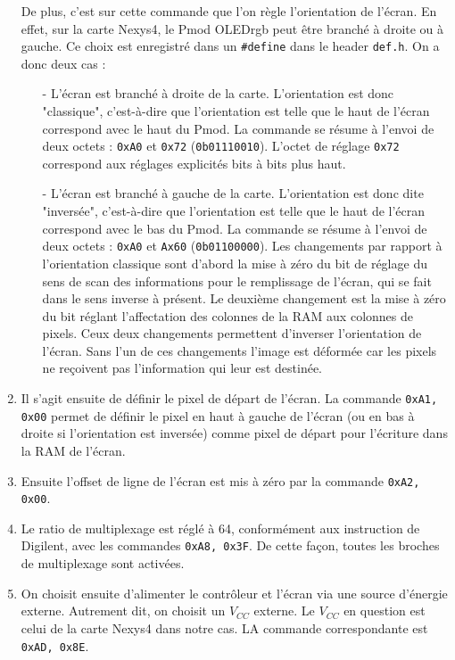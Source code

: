 \documentclass[11pt]{article}
\begin{document}
\begin{enumerate}
    De plus, c'est sur cette commande que l'on règle l'orientation de l'écran. En effet, sur la carte Nexys4, le Pmod OLEDrgb peut être branché à droite ou à gauche. Ce choix est enregistré dans un \texttt{\#define} dans le header \texttt{def.h}. On a donc deux cas : 
    \begin{itemize}
        \item[-] L'écran est branché à droite de la carte. L'orientation est donc "classique", c'est-à-dire que l'orientation est telle que le haut de l'écran correspond avec le haut du Pmod. La commande se résume à l'envoi de deux octets : \texttt{0xA0} et \texttt{0x72} (\texttt{0b01110010}). L'octet de réglage \texttt{0x72} correspond aux réglages explicités bits à bits plus haut. 
        \item[-] L'écran est branché à gauche de la carte. L'orientation est donc dite "inversée", c'est-à-dire que l'orientation est telle que le haut de l'écran correspond avec le bas du Pmod. La commande se résume à l'envoi de deux octets : \texttt{0xA0} et \texttt{Ax60} (\texttt{0b01100000}). Les changements par rapport à l'orientation classique sont d'abord la mise à zéro du bit de réglage du sens de scan des informations pour le remplissage de l'écran, qui se fait dans le sens inverse à présent. Le deuxième changement est la mise à zéro du bit réglant l'affectation des colonnes de la RAM aux colonnes de pixels. Ceux deux changements permettent d'inverser l'orientation de l'écran. Sans l'un de ces changements l'image est déformée car les pixels ne reçoivent pas l'information qui leur est destinée. 
    \end{itemize}

    \item Il s'agit ensuite de définir le pixel de départ de l'écran. La commande \texttt{0xA1, 0x00} permet de définir le pixel en haut à gauche de l'écran (ou en bas à droite si l'orientation est inversée) comme pixel de départ pour l’écriture dans la RAM de l'écran. 

    \item Ensuite l'offset de ligne de l'écran est mis à zéro par la commande \texttt{0xA2, 0x00}. 

    \item Le ratio de multiplexage est réglé à 64, conformément aux instruction de Digilent, avec les commandes \texttt{0xA8, 0x3F}. De cette façon, toutes les broches de multiplexage sont activées. 

    \item On choisit ensuite d'alimenter le contrôleur et l'écran via une source d'énergie externe. Autrement dit, on choisit un $V_{CC}$ externe. Le $V_{CC}$ en question est celui de la carte Nexys4 dans notre cas. LA commande correspondante est \texttt{0xAD, 0x8E}. 


\end{enumerate}
\end{document}
